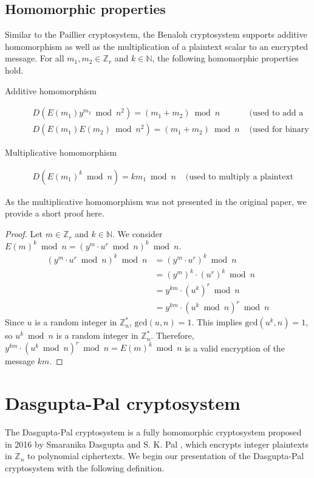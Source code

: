 \subsection{Homomorphic properties}
Similar to the Paillier cryptosystem, the Benaloh cryptosystem supports additive homomorphism as well as the multiplication of a plaintext scalar to an encrypted message.
For all $m_1,m_2 \in \mathbb{Z}_r$ and $k\in \mathbb{N}$, the following homomorphic properties hold.
\begin{description}
  \item[Additive homomorphism]
  \begin{align*}
    D(E(m_1)y^{m_2}\bmod n^2)=(m_1+m_2)\bmod n & \text{ (used to add a constant)}\\
    D(E(m_1)E(m_2)\bmod n^2)=(m_1+m_2)\bmod n & \text{ (used for binary addition)}
  \end{align*}
  \item[Multiplicative homomorphism]
  \begin{align*}
    D(E(m_1)^k\bmod n)= km_1\bmod n & \text{ (used to multiply a plaintext constant)}
  \end{align*}
\end{description}

As the multiplicative homomorphism was not presented in the original paper, we provide a short proof here.
\begin{proof}
  Let $m \in \mathbb{Z}_r$ and $k\in \mathbb{N}$.
  We consider $E(m)^k\bmod n = (y^m \cdot u^r \bmod{n})^k\bmod n$.
  \begin{align*}
    (y^m \cdot u^r \bmod{n})^k\bmod n
    &= (y^m \cdot u^r)^k \bmod{n}\\
    &= (y^m)^k \cdot (u^r)^k \bmod{n}\\
    &= y^{km} \cdot (u^k)^r \bmod{n}\\
    &= y^{km} \cdot (u^k \bmod{n})^r \bmod{n}
  \end{align*}
  Since $u$ is a random integer in $\mathbb{Z}_n^*$, $\mathrm{gcd}(u,n)=1$.
  This implies $\mathrm{gcd}(u^k,n)=1$, so $u^k \bmod n$ is a random integer in $\mathbb{Z}_n^*$.
  Therefore, $y^{km} \cdot (u^k \bmod{n})^r \bmod{n} = E(m)^k\bmod n$ is a valid encryption of the message $km$.
\end{proof}

\section{Dasgupta-Pal cryptosystem}
The Dasgupta-Pal cryptosystem is a fully homomorphic cryptosystem proposed in 2016 by Smaranika Dasgupta and S. K. Pal \cite{dasgupta_design_2016}, which encrypts integer plaintexts in $\mathbb{Z}_n$ to polynomial ciphertexts. We begin our presentation of the Dasgupta-Pal cryptosystem with the following definition.

